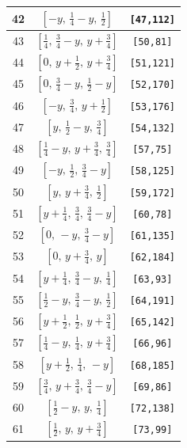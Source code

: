 \documentclass[fleqn,8pt]{jsarticle}
\begin{document}
\begin{longtable}{ccc}
42 & $\left[ - y,\, \frac{1}{4} - y,\, \frac{1}{2} \right]$ & {\tt [47,112]} \\ \hline
43 & $\left[ \frac{1}{4},\, \frac{3}{4} - y,\, y + \frac{3}{4} \right]$ & {\tt [50,81]} \\ \hline
44 & $\left[ 0,\, y + \frac{1}{2},\, y + \frac{3}{4} \right]$ & {\tt [51,121]} \\ \hline
45 & $\left[ 0,\, \frac{3}{4} - y,\, \frac{1}{2} - y \right]$ & {\tt [52,170]} \\ \hline
46 & $\left[ - y,\, \frac{3}{4},\, y + \frac{1}{2} \right]$ & {\tt [53,176]} \\ \hline
47 & $\left[ y,\, \frac{1}{2} - y,\, \frac{3}{4} \right]$ & {\tt [54,132]} \\ \hline
48 & $\left[ \frac{1}{4} - y,\, y + \frac{3}{4},\, \frac{3}{4} \right]$ & {\tt [57,75]} \\ \hline
49 & $\left[ - y,\, \frac{1}{2},\, \frac{3}{4} - y \right]$ & {\tt [58,125]} \\ \hline
50 & $\left[ y,\, y + \frac{3}{4},\, \frac{1}{2} \right]$ & {\tt [59,172]} \\ \hline
51 & $\left[ y + \frac{1}{4},\, \frac{3}{4},\, \frac{3}{4} - y \right]$ & {\tt [60,78]} \\ \hline
52 & $\left[ 0,\, - y,\, \frac{3}{4} - y \right]$ & {\tt [61,135]} \\ \hline
53 & $\left[ 0,\, y + \frac{3}{4},\, y \right]$ & {\tt [62,184]} \\ \hline
54 & $\left[ y + \frac{1}{4},\, \frac{3}{4} - y,\, \frac{1}{4} \right]$ & {\tt [63,93]} \\ \hline
55 & $\left[ \frac{1}{2} - y,\, \frac{3}{4} - y,\, \frac{1}{2} \right]$ & {\tt [64,191]} \\ \hline
56 & $\left[ y + \frac{1}{2},\, \frac{1}{2},\, y + \frac{3}{4} \right]$ & {\tt [65,142]} \\ \hline
57 & $\left[ \frac{1}{4} - y,\, \frac{1}{4},\, y + \frac{3}{4} \right]$ & {\tt [66,96]} \\ \hline
58 & $\left[ y + \frac{1}{2},\, \frac{1}{4},\, - y \right]$ & {\tt [68,185]} \\ \hline
59 & $\left[ \frac{3}{4},\, y + \frac{3}{4},\, \frac{3}{4} - y \right]$ & {\tt [69,86]} \\ \hline
60 & $\left[ \frac{1}{2} - y,\, y,\, \frac{1}{4} \right]$ & {\tt [72,138]} \\ \hline
61 & $\left[ \frac{1}{2},\, y,\, y + \frac{3}{4} \right]$ & {\tt [73,99]} \\ \hline

\end{longtable}
\end{document}
